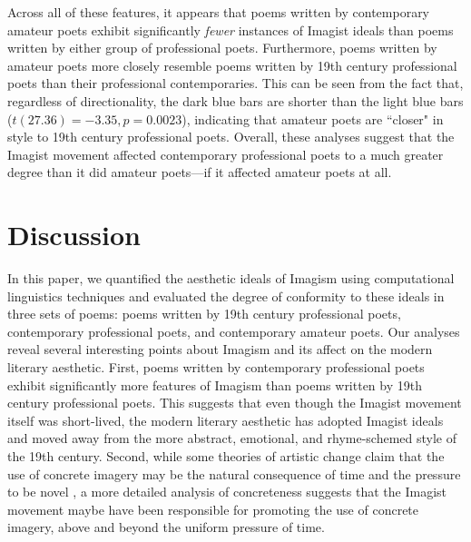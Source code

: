 \documentclass{book}
\begin{document}
Across all of these features, it appears that poems written by contemporary amateur poets exhibit significantly \emph{fewer} instances of Imagist ideals than poems written by either group of professional poets. Furthermore, poems written by amateur poets more closely resemble poems written by 19th century professional poets than their professional contemporaries. This can be seen from the fact that, regardless of directionality, the dark blue bars are shorter than the light blue bars ($t(27.36) = -3.35, p = 0.0023$), indicating that amateur poets are ``closer" in style to 19th century professional poets. Overall, these analyses suggest that the Imagist movement affected contemporary professional poets to a much greater degree than it did amateur poets---if it affected amateur poets at all.




\section{Discussion}
In this paper, we quantified the aesthetic ideals of Imagism using computational linguistics techniques and evaluated the degree of conformity to these ideals in three sets of poems: poems written by 19th century professional poets, contemporary professional poets, and contemporary amateur poets. Our analyses reveal several interesting points about Imagism and its affect on the modern literary aesthetic. First, poems written by contemporary professional poets exhibit significantly more features of Imagism than poems written by 19th century professional poets. This suggests that even though the Imagist movement itself was short-lived, the modern literary aesthetic has adopted Imagist ideals and moved away from the more abstract, emotional, and rhyme-schemed style of the 19th century. Second, while some theories of artistic change claim that the use of concrete imagery may be the natural consequence of time and the pressure to be novel \citep{martindale1990clockwork}, a more detailed analysis of concreteness suggests that the Imagist movement maybe have been responsible for promoting the use of concrete imagery, above and beyond the uniform pressure of time. 
\end{document}
